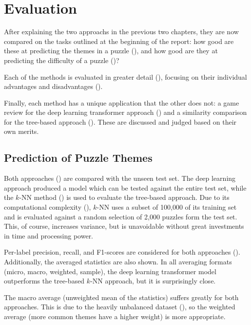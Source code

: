 \chapter{Evaluation}\label{evalChapter}

After explaining the two approachs in the previous two chapters, they are now
compared on the tasks outlined at the beginning of the report: how good are
these at predicting the themes in a puzzle (), and how good are
they at predicting the difficulty of a puzzle ()?

Each of the methods is evaluated in greater detail (),
focusing on their individual advantages and disadvantages
().

Finally, each method has a unique application that the other does not: a game
review for the deep learning transformer approach () and a
similarity comparison for the tree-based approach (). These are
discussed and judged based on their own merits.


\section{Prediction of Puzzle Themes}\label{evalS1}

Both approaches () are compared with the unseen
test set. The deep learning approach produced a model which can be tested
against the entire test set, while the $k$-NN method () is used to
evaluate the tree-based approach. Due to its computational complexity
(), $k$-NN uses a subset of 100,000 of its training set and is
evaluated against a random selection of 2,000 puzzles form the test set. This,
of course, increases variance, but is unavoidable without great investments in
time and processing power.

Per-label precision, recall, and F1-scores are considered for both approaches
(). Additionally, the averaged statistics are also shown. In
all averaging formats (micro, macro, weighted, sample), the deep learning
transformer model outperforms the tree-based $k$-NN approach, but it is
surprisingly close. 

The macro average (unweighted mean of the statistics) suffers greatly for both
approaches. This is due to the heavily unbalanced dataset
(), so the weighted average (more common themes have a
higher weight) is more appropriate.

